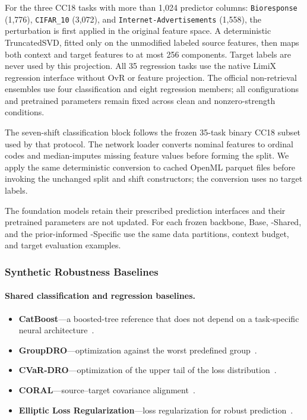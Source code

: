 For the three CC18 tasks with more
than 1,024 predictor columns: \texttt{Bioresponse} (1,776), \texttt{CIFAR\_10}
(3,072), and \texttt{Internet-Advertisements} (1,558), the perturbation is
first applied in the original feature space.  A deterministic
TruncatedSVD, fitted only on the unmodified labeled source features, then maps
both context and target features to at most 256 components.  Target labels are
never used by this projection.  All 35 regression tasks use the native LimiX
regression interface without OvR or feature projection.  The official
non-retrieval ensembles use four classification and eight regression members;
all configurations and pretrained parameters remain fixed across clean and
nonzero-strength conditions.

The seven-shift classification block follows the frozen 35-task binary CC18
subset used by that protocol.  The network loader converts nominal features to
ordinal codes and median-imputes missing feature values before forming the
split.  We apply the same deterministic conversion to cached OpenML parquet
files before invoking the unchanged split and shift constructors; the
conversion uses no target labels.

The foundation models retain their prescribed prediction interfaces and their
pretrained parameters are not updated.  For each frozen backbone, Base,
\method{}-Shared, and the prior-informed \method{}-Specific use the same data
partitions, context budget, and target evaluation examples.

\subsubsection{Synthetic Robustness Baselines}

\paragraph{Shared classification and regression baselines.}
\begin{itemize}
  \setlength{\itemsep}{1pt}
  \setlength{\parskip}{0pt}
  \item \textbf{CatBoost}---a boosted-tree reference that does not depend on a
  task-specific neural architecture~\citep{prokhorenkova2018catboost}.
  \item \textbf{GroupDRO}---optimization against the worst predefined
  group~\citep{sagawa2020groupdro}.
  \item \textbf{CVaR-DRO}---optimization of the upper tail of the loss
  distribution~\citep{rockafellar2000cvar}.
  \item \textbf{CORAL}---source--target covariance
  alignment~\citep{sun2016deepcoral}.
  \item \textbf{Elliptic Loss Regularization}---loss regularization for robust
  prediction~\citep{hasan2025elliptic}.
\end{itemize}

